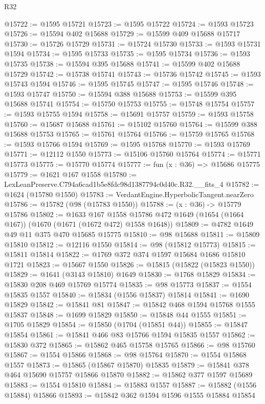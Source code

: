 \begin{lexlean}{R32}
\begin{coremodule}
@15722 := @1595 @15721
@15723 := @1595 @15722
@15724 := @1593 @15723
@15726 := @15594 @402 @15688
@15729 := @15599 @409 @15688 @15717
@15730 := @15726 @15729
@15731 := @15724 @15730
@15733 := @1593 @15731 @1594
@15734 := @1595 @15733
@15735 := @1595 @15734
@15736 := @1593 @15735
@15738 := @15594 @395 @15688
@15741 := @15599 @402 @15688 @15729
@15742 := @15738 @15741
@15743 := @15736 @15742
@15745 := @1593 @15743 @1594
@15746 := @1595 @15745
@15747 := @1595 @15746
@15748 := @1593 @15747
@15750 := @15594 @388 @15688
@15753 := @15599 @395 @15688 @15741
@15754 := @15750 @15753
@15755 := @15748 @15754
@15757 := @1593 @15755 @1594
@15758 := @15691 @15757
@15759 := @1593 @15758
@15760 := @15687 @15688
@15761 := @15102 @15760
@15764 := @15599 @388 @15688 @15753
@15765 := @15761 @15764
@15766 := @15759 @15765
@15768 := @1593 @15766 @1594
@15769 := @1595 @15768
@15770 := @1593 @15769
@15771 := @12112 @1550
@15773 := @15106 @15760 @15764
@15774 := @15771 @15773
@15775 := @15770 @15774
@15777 := fun (x : @36) => @15686 @15775
@15779 := @1621 @167 @1558
@15780 := LexLeanPreserve.C794a6cad1b5e8fdc98d1387794c0d40c.R32.__fits_4
@15782 := @1624 (@15780 @1550)
@15783 := VerdantEngine.HyperbolicTangent.nearZero
@15786 := @15782 (@98 (@15783 @1550))
@15788 := (x : @36) -> @15779 @15786
@15802 := @1633
    @167
    @1558
    @15786
    @472
    @1649
    (@1654 (@1664 @167))
    (@1670 (@1671 (@1672 @472) @1558 @1648))
@15809 := @4782 @1649 @49 @11 @375 @470 @15685 @15775
@15810 := @98 @15688
@15811 := @15809 @15810
@15812 := @12116 @1550
@15814 := @98 (@15812 @15773)
@15815 := @15811 @15814
@15822 := @1769 @372 @374 @1597 @15684 @1686 @15810 @1721
@15823 := @15667 @1550
@15826 := @15815 (@15822 (@15823 @1550))
@15829 := @1641 (@3143 @15810) @1649
@15830 := @1768 @15829
@15834 := @15830 @208 @469 @15769 @15774
@15835 := @98 @15773
@15837 := @1554 @15835 @1557
@15840 := @15834 (@1556 @15837) @15814
@15841 := @1690 @15829
@15842 := @15841 @81
@15847 := @15842 @468 @1594 @15768 @1555 @15837
@15848 := @1699 @15829
@15850 := @15848 @44 @1555
@15851 := @1705 @15829
@15854 := @15850 (@1704 (@15851 @44))
@15855 := @15847 @15854
@15861 := @15841 @466 @83 @15766 @1594 @15835 @1557
@15862 := @15830 @372
@15865 := @15862 @465 @15758 @15765
@15866 := @98 @15760
@15867 := @1554 @15866
@15868 := @98 @15764
@15870 := @1554 @15868 @1557
@15873 := @15865 (@15867 @15870) @15835
@15879 := @15841 @378 @464 @15690 @15757 @15866 @15870
@15882 := @15862 @377 @1597 @15689
@15883 := @1554 @15810
@15884 := @15883 @1557
@15887 := @15882 (@1556 @15884) @15866
@15893 := @15842 @362 @1594 @1596 @1555 @15884 @15854

\end{coremodule}
\end{lexlean}

